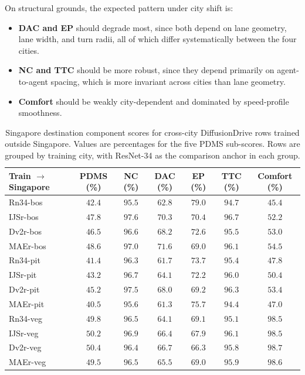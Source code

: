 On structural grounds, the expected pattern under city shift is:

\begin{itemize}
    \item \textbf{DAC and EP} should degrade most, since both depend on lane geometry, lane width, and turn radii, all of which differ systematically between the four cities.
    \item \textbf{NC and TTC} should be more robust, since they depend primarily on agent-to-agent spacing, which is more invariant across cities than lane geometry.
    \item \textbf{Comfort} should be weakly city-dependent and dominated by speed-profile smoothness.
\end{itemize}

\begin{table}[ht]
\centering
\caption[Singapore component breakdown for the cross-city DiffusionDrive matrix.]{Singapore destination component scores for cross-city DiffusionDrive rows trained outside Singapore. Values are percentages for the five PDMS sub-scores. Rows are grouped by training city, with ResNet-34 as the comparison anchor in each group.}
\label{tab:dd-cc-singapore-components}
\small
\renewcommand{\arraystretch}{1.15}
\setlength{\tabcolsep}{5pt}
\begin{tabular}{@{}>{\raggedright\arraybackslash}p{3.6cm} c c c c c c@{}}
\toprule
\textbf{Train $\rightarrow$ Singapore} & \textbf{PDMS (\%)} & \textbf{NC (\%)} & \textbf{DAC (\%)} & \textbf{EP (\%)} & \textbf{TTC (\%)} & \textbf{Comfort (\%)} \\
\midrule
Rn34-bos & $42.4$ & $95.5$ & $62.8$ & $79.0$ & $94.7$ & $45.4$ \\
IJSr-bos & $47.8$ & $97.6$ & $70.3$ & $70.4$ & $96.7$ & $52.2$ \\
Dv2r-bos & $46.5$ & $96.6$ & $68.2$ & $72.6$ & $95.5$ & $53.0$ \\
MAEr-bos & $48.6$ & $97.0$ & $71.6$ & $69.0$ & $96.1$ & $54.5$ \\
\midrule
Rn34-pit & $41.4$ & $96.3$ & $61.7$ & $73.7$ & $95.4$ & $47.8$ \\
IJSr-pit & $43.2$ & $96.7$ & $64.1$ & $72.2$ & $96.0$ & $50.4$ \\
Dv2r-pit & $45.2$ & $97.5$ & $68.0$ & $69.2$ & $96.3$ & $53.4$ \\
MAEr-pit & $40.5$ & $95.6$ & $61.3$ & $75.7$ & $94.4$ & $47.0$ \\
\midrule
Rn34-veg & $49.8$ & $96.5$ & $64.1$ & $69.1$ & $95.1$ & $98.5$ \\
IJSr-veg & $50.2$ & $96.9$ & $66.4$ & $67.9$ & $96.1$ & $98.5$ \\
Dv2r-veg & $50.4$ & $96.4$ & $66.7$ & $66.3$ & $95.8$ & $98.7$ \\
MAEr-veg & $49.5$ & $96.5$ & $65.5$ & $69.0$ & $95.9$ & $98.6$ \\
\bottomrule
\end{tabular}
\end{table}


